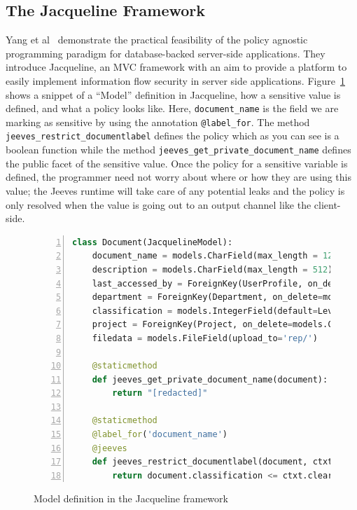 \subsection{The Jacqueline Framework}
Yang et al~\cite{Jacqueline} demonstrate the practical feasibility of the policy
agnostic programming paradigm for database-backed server-side applications.
They introduce Jacqueline, an MVC framework with an aim to provide a platform to
easily implement information flow security in server side applications. Figure~\ref{fig:DRS}
shows a snippet of a ``Model'' definition in Jacqueline, how a sensitive value is
defined, and what a policy looks like. Here, \texttt{document\_name} is the field
we are marking as sensitive by using the annotation \texttt{@label\_for}. The method
\texttt{jeeves\_restrict\_documentlabel} defines the policy which as you can see
is a boolean function while the method \texttt{jeeves\_get\_private\_document\_name}
defines the public facet of the sensitive value. Once the policy for a sensitive
variable is defined, the programmer need not worry about where or how they are
using this value; the Jeeves runtime will take care of any potential leaks and the
policy is only resolved when the value is going out to an output channel like the
client-side.

\begin{figure}
\begin{lstlisting}[language=Python, frame=single, breaklines=true, keywordstyle=\color{keywords}, stringstyle=\color{red}, identifierstyle=\color{darkgray}, procnamekeys={def,class}, basicstyle=\footnotesize\ttfamily, numbers=left, extendedchars=true, tabsize=2]
class Document(JacquelineModel):
    document_name = models.CharField(max_length = 128)
    description = models.CharField(max_length = 512)
    last_accessed_by = ForeignKey(UserProfile, on_delete=models.CASCADE)
    department = ForeignKey(Department, on_delete=models.CASCADE)
    classification = models.IntegerField(default=Levels.TOP_SECRET)
    project = ForeignKey(Project, on_delete=models.CASCADE)
    filedata = models.FileField(upload_to='rep/')

    @staticmethod
    def jeeves_get_private_document_name(document):
        return "[redacted]"

    @staticmethod
    @label_for('document_name')
    @jeeves
    def jeeves_restrict_documentlabel(document, ctxt):
        return document.classification <= ctxt.clearance and document.department == ctxt.department
\end{lstlisting}
\caption{Model definition in the Jacqueline framework}
\label{fig:DRS}
\end{figure}

